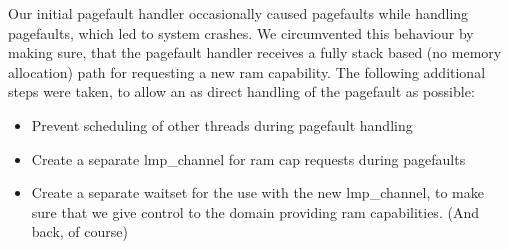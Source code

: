 Our initial pagefault handler occasionally caused pagefaults while handling 
pagefaults, which led to system crashes. We circumvented this behaviour by 
making sure, that the pagefault handler receives a fully stack based (no 
memory allocation) path for requesting a new ram capability. The following 
additional steps were taken, to allow an as direct handling of the pagefault 
as possible:

\begin{itemize}
	\item Prevent scheduling of other threads during pagefault handling

	\item Create a separate lmp\_channel for ram cap requests during pagefaults

	\item Create a separate waitset for the use with the new lmp\_channel, 
    to make sure that we give control to the domain providing ram 
    capabilities. (And back, of course)
\end{itemize}
